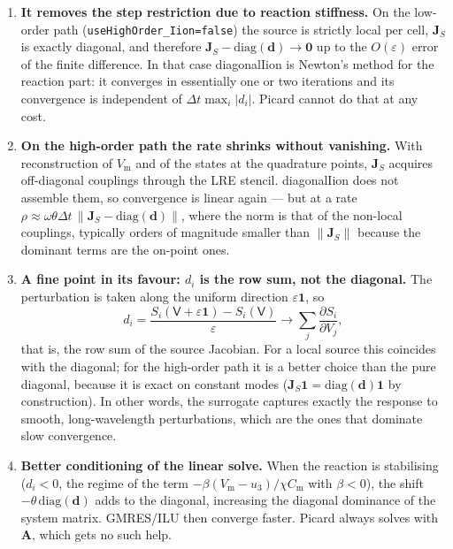 \documentclass[11pt,a4paper]{article}
\newcommand{\code}[1]{\texttt{\small #1}}
\newcommand{\Vm}{V_{\text{m}}}
\newcommand{\Aimp}{\mathbf{A}}
\newcommand{\norm}[1]{\left\lVert #1 \right\rVert}
\begin{document}
\begin{enumerate}
\item \textbf{It removes the step restriction due to reaction stiffness.} On the
low-order path (\code{useHighOrder\_Iion=false}) the source is strictly local
per cell, $\mathbf{J}_S$ is exactly diagonal, and therefore
$\mathbf{J}_S-\mathrm{diag}(\mathbf{d})\to\mathbf{0}$ up to the $O(\varepsilon)$
error of the finite difference. In that case diagonalIion is
Newton's method for the reaction part: it converges in essentially one or two
iterations and its convergence is independent of $\Delta t\max_i|d_i|$. Picard
cannot do that at any cost.

\item \textbf{On the high-order path the rate shrinks without vanishing.} With
reconstruction of $\Vm$ and of the states at the quadrature points,
$\mathbf{J}_S$ acquires off-diagonal couplings through the LRE stencil.
diagonalIion does not assemble them, so convergence is linear again ---
but at a rate
$\rho\approx\omega\theta\Delta t\,\norm{\mathbf{J}_S-\mathrm{diag}(\mathbf{d})}$,
where the norm is that of the non-local couplings, typically orders of magnitude
smaller than $\norm{\mathbf{J}_S}$ because the dominant terms are the on-point
ones.

\item \textbf{A fine point in its favour: $d_i$ is the row sum, not the
diagonal.} The perturbation is taken along the uniform direction
$\varepsilon\mathbf{1}$, so $$d_i=\frac{S_i(\mathsf{V}+\varepsilon\mathbf{1})-S_i(\mathsf{V})}{\varepsilon}\longrightarrow\sum_j\frac{\partial S_i}{\partial V_j},$$ that is, the row sum of the source Jacobian. For a local source this coincides
with the diagonal; for the high-order path it is a better choice than the pure
diagonal, because it is exact on constant modes
($\mathbf{J}_S\mathbf{1}=\mathrm{diag}(\mathbf{d})\mathbf{1}$ by construction).
In other words, the surrogate captures exactly the response to smooth,
long-wavelength perturbations, which are the ones that dominate slow
convergence.

\item \textbf{Better conditioning of the linear solve.} When the reaction is
stabilising ($d_i<0$, the regime of the term
$-\beta(\Vm-u_3)/\chi C_{\text{m}}$ with $\beta<0$), the shift
$-\theta\,\mathrm{diag}(\mathbf{d})$ adds to the diagonal, increasing the
diagonal dominance of the system matrix. GMRES/ILU then converge faster. Picard
always solves with $\Aimp$, which gets no such help.


\end{enumerate}
\end{document}
